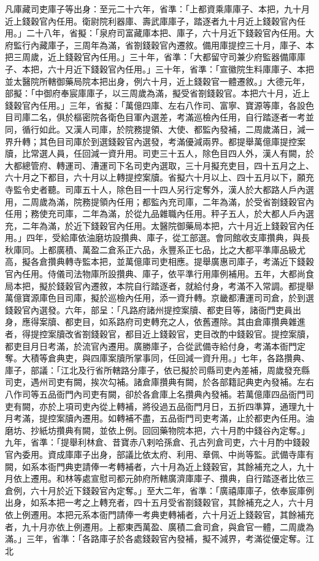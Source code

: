 \begin{pinyinscope}
 凡庫藏司吏庫子等出身：至元二十六年，省準：「上都資乘庫庫子、本把，九十月近上錢穀官內任用。衛尉院利器庫、壽武庫庫子，踏逐者九十月近上錢穀官內任用。」二十八年，省擬：「泉府司富藏庫本把、庫子，六十月近下錢穀官內任用。大府監行內藏庫子，三周年為滿，省劄錢穀官內遷敘。備用庫提控三十月，庫子、本把三周歲，近上錢穀官內任用。」三十年，省準：「大都留守司兼少府監器備庫庫子、本把，六十月近下錢穀官內任用。」三十年，省準：「宣徽院生料庫庫子、本把並太醫院所轄御藥局院本把出身，例六十月，近上錢穀官一體遷敘。」大德元年，部擬：「中御府奉宸庫庫子，以三周歲為滿，擬受省劄錢穀官。本把六十月，近上錢穀官內任用。」三年，省擬：「萬億四庫、左右八作司、富寧、寶源等庫，各設色目司庫二名，俱於樞密院各衛色目軍內選差，考滿巡檢內任用，自行踏逐者一考並同，循行如此。又漢人司庫，於院務提領、大使、都監內發補，二周歲滿日，減一界升轉；其色目司庫於到選錢穀官內選發，考滿優減兩界。都提舉萬億庫提控案牘，比常選人員，任回減一資升用。司吏三十五人，除色目四人外，漢人有闕，於大都總管府、轉運司、漕運司下名司吏內選取，三十月擬充吏目，四十五月之上、六十月之下都目，六十月以上轉提控案牘。省擬六十月以上、四十五月以下，願充寺監令史者聽。司庫五十人，除色目一十四人另行定奪外，漢人於大都路人戶內選用，二周歲為滿，院務提領內任用；都監內充司庫，二年為滿，於受省劄錢穀官內任用；務使充司庫，二年為滿，於從九品雜職內任用。秤子五人，於大都人戶內選充，二年為滿，於近下錢穀官內任用。太醫院御藥局本把，六十月近上錢穀官內任用。」四年，受給庫依油磨坊設攢典、庫子，從工部選。會同館收支庫攢典，與長秋庫同。上都廣積、萬盈二倉系正六品，永豐系正七品，比之大都平準庫品級尤高，擬各倉攢典轉寺監本把，並萬億庫司吏相應。提舉廣惠司庫子，考滿近下錢穀官內任用。侍儀司法物庫所設攢典、庫子，依平準行用庫例補用。五年，大都尚食局本把，擬於錢穀官內遷敘，本院自行踏逐者，就給付身，考滿不入常調。都提舉萬億寶源庫色目司庫，擬於巡檢內任用，添一資升轉。京畿都漕運司司倉，於到選錢穀官內選發。六年，部呈：「凡路府諸州提控案牘、都吏目等，諸衙門吏員出身，應得案牘、都吏目，如系路府司吏轉充之人，依舊遷除。其由倉庫攢典雜進者，得提控案牘改省劄錢穀官，都目近上錢穀官，吏目改酌中錢穀官。提控案牘，都吏目月日考滿，於流官內遷用。廣勝庫子，合從武備寺給付身，考滿本衙門定奪。大積等倉典吏，與四庫案牘所掌事同，任回減一資升用。」七年，各路攢典、庫子，部議：「江北及行省所轄路分庫子，依已擬於司縣司吏內差補，周歲發充縣司吏，遇州司吏有闕，挨次勾補。諸倉庫攢典有闕，於各部籍記典吏內發補。左右八作司等五品衙門內司吏有闕，卻於各倉庫上名攢典內發補。若萬億庫四品衙門司吏有闕，亦於上項司吏內從上轉補，將役過五品衙門月日，五折四準算，通理九十月考滿，提控案牘內遷用。如轉補不盡，五品衙門司吏考滿，止於都吏內任用。油磨坊、抄紙坊攢典有闕，並依上例。回回藥物院本把，六十月酌中錢谷內定奪。」九年，省準：「提舉利林倉、昔寶赤八剌哈孫倉、孔古列倉司吏，六十月酌中錢穀官內委用。資成庫庫子出身，部議比依太府、利用、章佩、中尚等監。武備寺庫有闕，如系本衙門典吏請俸一考轉補者，六十月為近上錢穀官，其餘補充之人，九十月依上遷用。和林等處宣慰司都元帥府所轄廣濟庫庫子、攢典，自行踏逐者比依三倉例，六十月於近下錢穀官內定奪。」至大二年，省準：「廣禧庫庫子，依奉宸庫例出身，如系本把一考之上轉充者，四十五月受省劄錢穀官，其餘補充之人，六十月依上例遷用。本把元系本衙門請俸一考典吏轉補者，六十月近上錢穀官，其餘補充者，九十月亦依上例遷用。上都東西萬盈、廣積二倉司倉，與倉官一體，二周歲為滿。」三年，省準：「各路庫子於各處錢穀官內發補，擬不減界，考滿從優定奪。江北
\end{pinyinscope}
